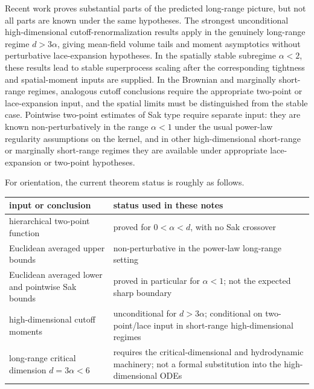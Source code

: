 \documentclass[11pt,reqno]{book}
\numberwithin{equation}{chapter}
\theoremstyle{plain}
\theoremstyle{definition}
\theoremstyle{remark}
\newcommand{\1}{\mathbf 1}
\begin{document}
Recent work proves substantial parts of the predicted long-range picture, but not all parts are known under the same hypotheses. The strongest unconditional high-dimensional cutoff-renormalization results apply in the genuinely long-range regime \(d>3\alpha\), giving mean-field volume tails and moment asymptotics without perturbative lace-expansion hypotheses. In the spatially stable subregime \(\alpha<2\), these results lead to stable superprocess scaling after the corresponding tightness and spatial-moment inputs are supplied. In the Brownian and marginally short-range regimes, analogous cutoff conclusions require the appropriate two-point or lace-expansion input, and the spatial limits must be distinguished from the stable case. Pointwise two-point estimates of Sak type require separate input: they are known non-perturbatively in the range \(\alpha<1\) under the usual power-law regularity assumptions on the kernel, and in other high-dimensional short-range or marginally short-range regimes they are available under appropriate lace-expansion or two-point hypotheses.

For orientation, the current theorem status is roughly as follows.
\begin{center}
\begin{tabular}{p{}p{}}
\toprule
input or conclusion & status used in these notes\\
\midrule
hierarchical two-point function
& proved for \(0<\alpha<d\), with no Sak crossover\\
Euclidean averaged upper bounds
& non-perturbative in the power-law long-range setting\\
Euclidean averaged lower and pointwise Sak bounds
& proved in particular for \(\alpha<1\); not the expected sharp boundary\\
high-dimensional cutoff moments
& unconditional for \(d>3\alpha\); conditional on two-point/lace input in short-range high-dimensional regimes\\
long-range critical dimension \(d=3\alpha<6\)
& requires the critical-dimensional and hydrodynamic machinery; not a formal substitution into the high-dimensional ODEs\\
\bottomrule
\end{tabular}
\end{center}
\end{document}
